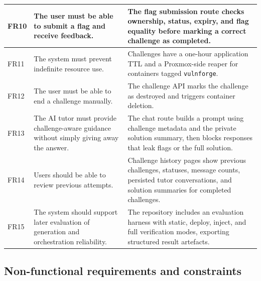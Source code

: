 \begin{longtable}{|p{}|p{}|p{}|}
	\hline
	FR10        & The user must be able to submit a flag and receive feedback.                                    & The flag submission route checks ownership, status, expiry, and flag equality before marking a correct challenge as completed.                              \\
	\hline
	FR11        & The system must prevent indefinite resource use.                                                & Challenges have a one-hour application TTL and a Proxmox-side reaper for containers tagged \lstinline|vulnforge|.                                           \\
	\hline
	FR12        & The user must be able to end a challenge manually.                                              & The challenge API marks the challenge as destroyed and triggers container deletion.                                                                         \\
	\hline
	FR13        & The AI tutor must provide challenge-aware guidance without simply giving away the answer.       & The chat route builds a prompt using challenge metadata and the private solution summary, then blocks responses that leak flags or the full solution.       \\
	\hline
	FR14        & Users should be able to review previous attempts.                                               & Challenge history pages show previous challenges, statuses, message counts, persisted tutor conversations, and solution summaries for completed challenges. \\
	\hline
	FR15        & The system should support later evaluation of generation and orchestration reliability.         & The repository includes an evaluation harness with static, deploy, inject, and full verification modes, exporting structured result artefacts.              \\
	\hline
\end{longtable}

\subsection{Non-functional requirements and constraints}\label{sec:non_functional_requirements}

